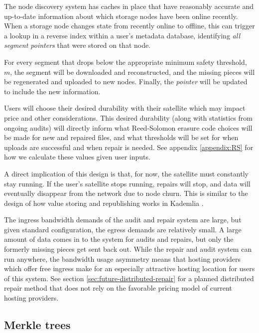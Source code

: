 \documentclass[11pt,fleqn,openany]{book}
\begin{document}
The node discovery system has caches in place that have reasonably accurate and
up-to-date information about which storage nodes have been online recently.
When a storage node changes state from recently online to offline, this can
trigger a lookup in a reverse index within a user's metadata database, identifying
{\em all segment pointers} that were stored on that node.

For every segment that drops below the appropriate minimum safety
threshold, $m$, the segment will be downloaded and reconstructed, and the
missing pieces will be regenerated and uploaded to new nodes. Finally, the
{\em pointer} will be updated to include the new information.

Users will choose their desired durability with their satellite
which may impact price and other considerations. This desired durability (along with
statistics from ongoing audits) will directly inform what Reed-Solomon erasure
code choices will be made for new and repaired files, and what thresholds
will be set for when uploads are successful and when repair is needed. See
appendix \ref{appendix:RS} for how we calculate these values given user inputs.

A direct implication of this design is that, for now, the satellite must
constantly stay running. If the user's satellite stops running, repairs will
stop, and data will eventually disappear from the network due to node churn.
This is similar to the design of how value storing and republishing works in
Kademlia \cite{kad}.

The ingress bandwidth demands of the audit and repair system are large, but
given standard configuration, the egress demands are relatively small.
A large amount of data comes in to the system for audits and repairs, but only
the formerly missing pieces get sent back out.
While the repair and audit system can run anywhere, the bandwidth usage
asymmetry means that hosting providers which offer free ingress
make for an especially attractive hosting location for users of this system.
See section \ref{sec:future-distributed-repair} for a planned distributed
repair method that
does not rely on the favorable pricing model of current hosting providers.

\subsection{Merkle trees}
\end{document}
